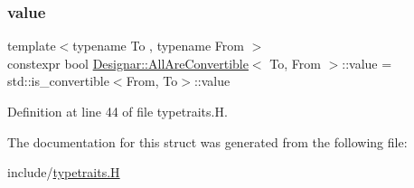\subsubsection{\texorpdfstring{value}{value}}
{\footnotesize\ttfamily template$<$typename To , typename From $>$ \\
constexpr bool \hyperlink{struct_designar_1_1_all_are_convertible}{Designar\+::\+All\+Are\+Convertible}$<$ To, From $>$\+::value = std\+::is\+\_\+convertible$<$From, To$>$\+::value\hspace{0.3cm}{\ttfamily [static]}}



Definition at line 44 of file typetraits.\+H.



The documentation for this struct was generated from the following file\+:\begin{DoxyCompactItemize}
\item 
include/\hyperlink{typetraits_8_h}{typetraits.\+H}\end{DoxyCompactItemize}
